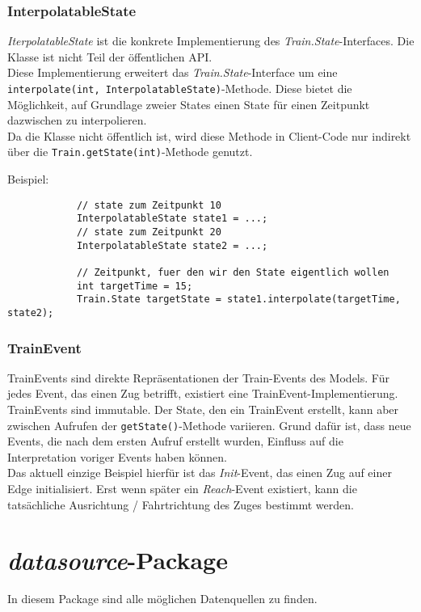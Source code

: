 \documentclass[accentcolor=tud0b,12pt,paper=a4]{tudreport}
\begin{document}
		\subsection{InterpolatableState}
			\textit{IterpolatableState} ist die konkrete Implementierung des \textit{Train.State}-Interfaces.
			Die Klasse ist nicht Teil der öffentlichen API.\\
			
			Diese Implementierung erweitert das \textit{Train.State}-Interface um eine\\
			\texttt{interpolate(int, InterpolatableState)}-Methode. Diese bietet die Möglichkeit, auf Grundlage zweier States einen State für einen Zeitpunkt dazwischen zu interpolieren.\\
			Da die Klasse nicht öffentlich ist, wird diese Methode in Client-Code nur indirekt über die \texttt{Train.getState(int)}-Methode genutzt.
			
			Beispiel:\\
			\begin{lstlisting}
			// state zum Zeitpunkt 10
			InterpolatableState state1 = ...;
			// state zum Zeitpunkt 20
			InterpolatableState state2 = ...;
			
			// Zeitpunkt, fuer den wir den State eigentlich wollen
			int targetTime = 15;
			Train.State targetState = state1.interpolate(targetTime, state2);
			\end{lstlisting}
			
		
		\subsection{TrainEvent}
		\label{trainevent}
			TrainEvents sind direkte Repräsentationen der Train-Events des Models. Für jedes Event, das einen Zug betrifft, existiert eine TrainEvent-Implementierung.
			TrainEvents sind immutable. Der State, den ein TrainEvent erstellt, kann aber zwischen Aufrufen der \texttt{getState()}-Methode variieren. Grund dafür ist, dass neue Events, die nach dem ersten Aufruf erstellt wurden, Einfluss auf die Interpretation voriger Events haben können.\\
			Das aktuell einzige Beispiel hierfür ist das \textit{Init}-Event, das einen Zug auf einer Edge initialisiert. Erst wenn später ein \textit{Reach}-Event existiert, kann die tatsächliche Ausrichtung / Fahrtrichtung des Zuges bestimmt werden.
		
		
	\chapter{\textit{datasource}-Package}
	In diesem Package sind alle möglichen Datenquellen zu finden.
	
\end{document}
